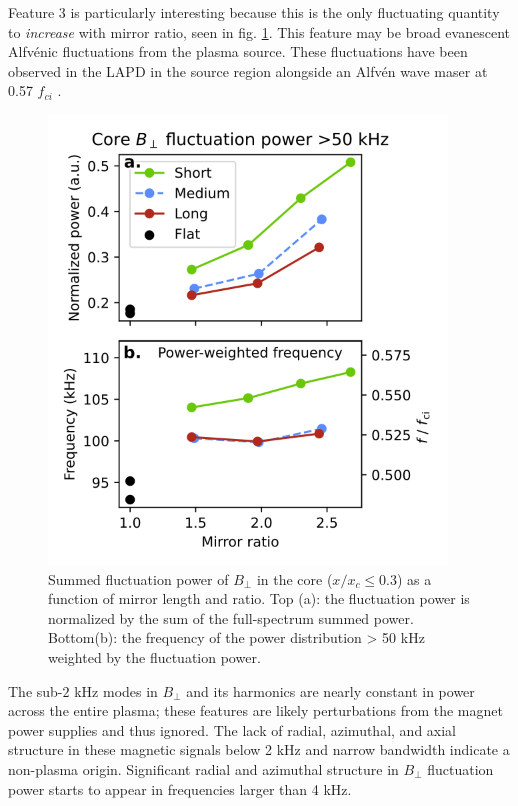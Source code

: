 Feature 3 is particularly interesting because this is the only fluctuating quantity to \textit{increase} with mirror ratio, seen in fig. \ref{fig:Bperp_core_highfreq}. This feature may be broad evanescent Alfv\'enic fluctuations from the plasma source. These fluctuations have been observed in the LAPD in the source region alongside an Alfvén wave maser at 0.57 $f_{ci}$ \cite{Maggs_2005}.

\begin{figure}
    \centering
    \includegraphics[width=300pt]{figures/fig15.pdf}
    \caption[Summed fluctuation power of $B_\perp$ in the core]{Summed fluctuation power of $B_\perp$ in the core ($x/x_c \leq 0.3$) as a function of mirror length and ratio. Top (a): the fluctuation power is normalized by the sum of the full-spectrum summed power. Bottom(b): the frequency of the power distribution > 50 kHz weighted by the fluctuation power.}
    \label{fig:Bperp_core_highfreq}
\end{figure}

The sub-$2$ kHz modes in $B_\perp$ and its harmonics are nearly constant in power across the entire plasma; these features are likely perturbations from the magnet power supplies and thus ignored. The lack of radial, azimuthal, and axial structure in these magnetic signals below 2 kHz and narrow bandwidth indicate a non-plasma origin. Significant radial and azimuthal structure in $B_\perp$ fluctuation power starts to appear in frequencies larger than 4 kHz.

